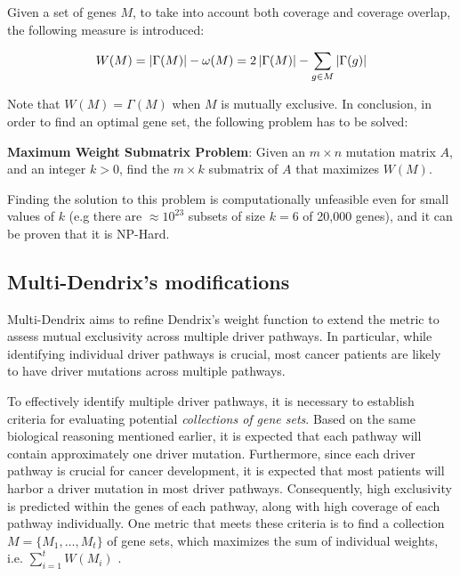 Given a set of genes $M$, to take into account both coverage and coverage overlap, the following measure is introduced:

\begin{equation}\label{weight}
    W(M) = \left|\Gamma(M)\right| - \omega(M) = 2 \left|\Gamma(M)\right| - \sum_{g \in M} {\left|\Gamma(g)\right|}
\end{equation}

Note that $W(M) = \Gamma(M)$ when $M$ is mutually exclusive. In conclusion, in order to find an optimal gene set, the following problem has to be solved:

\begin{displayquote}
    \textbf{Maximum Weight Submatrix Problem}: Given an $m \times n$ mutation matrix $A$, and an integer $k > 0$, find the $m \times k$ submatrix of $A$ that maximizes $W(M)$.
\end{displayquote}

Finding the solution to this problem is computationally unfeasible even for small values of $k$ (e.g there are $\approx 10^{23}$ subsets of size $k = 6$ of 20,000 genes), and it can be proven that it is NP-Hard. 

\subsection{Multi-Dendrix's modifications}

Multi-Dendrix aims to refine Dendrix's weight function to extend the metric to assess mutual exclusivity across multiple driver pathways. In particular, while identifying individual driver pathways is crucial, most cancer patients are likely to have driver mutations across multiple pathways.

To effectively identify multiple driver pathways, it is necessary to establish criteria for evaluating potential \textit{collections of gene sets}. Based on the same biological reasoning mentioned earlier, it is expected that each pathway will contain approximately one driver mutation. Furthermore, since each driver pathway is crucial for cancer development, it is expected that most patients will harbor a driver mutation in most driver pathways. Consequently, high exclusivity is predicted within the genes of each pathway, along with high coverage of each pathway individually. One metric that meets these criteria is to find a collection $M = \{M_1, \ldots, M_t\}$ of gene sets, which maximizes the sum of individual weights, i.e. $\sum_{i = 1}^t {W(M_i)}$ \cite{multi-dendrix}.

